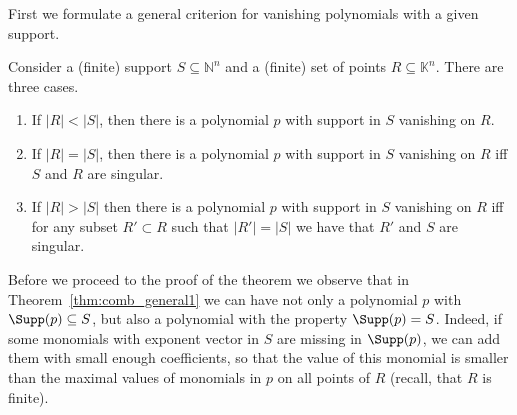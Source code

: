 \documentclass[11pt]{article}
\begin{document}
First we formulate a general criterion for vanishing polynomials with a given support.

\begin{theorem} \label{thm:comb_general}
Consider a (finite) support $S \subseteq \mathbb{N}^n$ and a (finite) set of points $R \subseteq \mathbb{K}^n$. There are three cases.
\renewcommand*{\theenumi}{\thetheorem(\roman{enumi})}%
  \renewcommand*{\labelenumi}{(\roman{enumi})}%

\begin{enumerate}
\item \label{thm:comb_general1} If $|R| < |S|$, then there is a polynomial $p$ with support in $S$ vanishing on $R$.
\item \label{thm:comb_general2} If $|R|=|S|$, then there is a polynomial $p$ with support in $S$ vanishing on $R$ iff $S$ and $R$ are singular.
\item \label{thm:comb_general3} If $|R|>|S|$ then there is a polynomial $p$ with support in $S$ vanishing on $R$ iff for any subset $R'\subset R$ such that $|R'|=|S|$ we have that $R'$ and $S$ are singular.
\end{enumerate}

\begin{remark}
Before we proceed to the proof of the theorem we observe that in Theorem~\ref{thm:comb_general1} we can have not only a polynomial $p$ with $\Supp(p)\subseteq S$, but also a polynomial with the property $\Supp(p)=S$. Indeed, if some monomials with exponent vector in $S$ are missing in $\Supp(p)$, we can add them with small enough coefficients, so that the value of this monomial is smaller than the maximal values of monomials in $p$ on all points of $R$ (recall, that $R$ is finite).
\end{remark}

\end{theorem}
\end{document}
